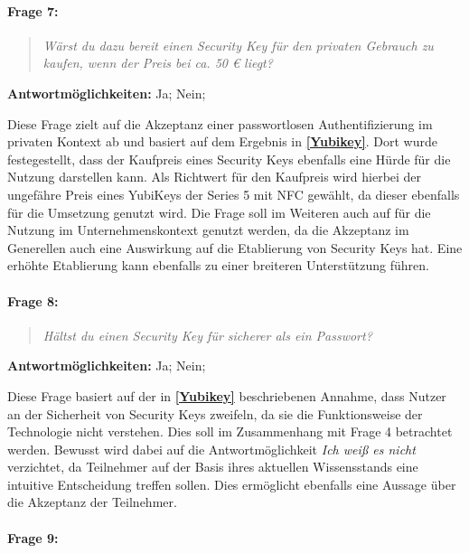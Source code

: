 \paragraph{Frage 7:}

\begin{quote}
    \textit{Wärst du dazu bereit einen Security Key für den privaten Gebrauch zu kaufen, wenn der Preis bei ca. 50 € liegt?}
\end{quote}

\textbf{Antwortmöglichkeiten:} Ja; Nein;

Diese Frage zielt auf die Akzeptanz einer passwortlosen Authentifizierung im privaten Kontext ab und basiert auf dem Ergebnis in \textbf{\ref{Yubikey}}. Dort wurde festegestellt, dass der Kaufpreis eines Security Keys ebenfalls eine Hürde für die Nutzung darstellen kann. Als Richtwert für den Kaufpreis wird hierbei der ungefähre Preis eines YubiKeys der Series 5 mit NFC gewählt, da dieser ebenfalls für die Umsetzung genutzt wird. Die Frage soll im Weiteren auch auf für die Nutzung im Unternehmenskontext genutzt werden, da die Akzeptanz im Generellen auch eine Auswirkung auf die Etablierung von Security Keys hat. Eine erhöhte Etablierung kann ebenfalls zu einer breiteren Unterstützung führen.

\paragraph{Frage 8:}

\begin{quote}
    \textit{Hältst du einen Security Key für sicherer als ein Passwort?}
\end{quote}

\textbf{Antwortmöglichkeiten:} Ja; Nein;

Diese Frage basiert auf der in \textbf{\ref{Yubikey}} beschriebenen Annahme, dass Nutzer an der Sicherheit von Security Keys zweifeln, da sie die Funktionsweise der Technologie nicht verstehen. Dies soll im Zusammenhang mit Frage 4 betrachtet werden. Bewusst wird dabei auf die Antwortmöglichkeit \textit{Ich weiß es nicht} verzichtet, da Teilnehmer auf der Basis ihres aktuellen Wissensstands eine intuitive Entscheidung treffen sollen. Dies ermöglicht ebenfalls eine Aussage über die Akzeptanz der Teilnehmer. 

\paragraph{Frage 9:}

